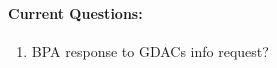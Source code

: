 \documentclass[12pt]{article}
\begin{document}
\begin{multicols}{2}
	\paragraph{Current Questions:}
	\begin{enumerate}
\itemsep0em 
	\item BPA response to GDACs info request?
	\end{enumerate}
	

\end{multicols}
\end{document}
